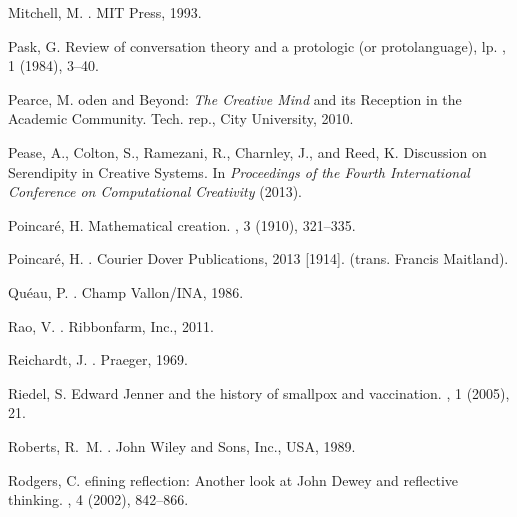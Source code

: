 \documentclass{llncs}
\begin{document}
\begin{thebibliography}{10}
{\sc Mitchell, M.}
.
\newblock MIT Press, 1993.

{\sc Pask, G.}
\newblock Review of conversation theory and a protologic (or protolanguage),
  lp.
, 1 (1984), 3--40.

{\sc Pearce, M.}
oden and {B}eyond: \emph{{T}he {C}reative {M}ind} and its
  {R}eception in the {A}cademic {C}ommunity.
\newblock Tech. rep., City University, 2010.

{\sc Pease, A., Colton, S., Ramezani, R., Charnley, J., and Reed, K.}
 {D}iscussion on {S}erendipity in {C}reative {S}ystems.
\newblock In {\em Proceedings of the Fourth International Conference on
  Computational Creativity\/} (2013).

{\sc Poincar{\'e}, H.}
\newblock Mathematical creation.
, 3 (1910), 321--335.

{\sc Poincar{\'e}, H.}
.
\newblock Courier Dover Publications, 2013 [1914].
\newblock (trans. Francis Maitland).

{\sc Qu{\'e}au, P.}
.
\newblock Champ Vallon/INA, 1986.

{\sc Rao, V.}
.
\newblock Ribbonfarm, Inc., 2011.

{\sc Reichardt, J.}
.
\newblock Praeger, 1969.

{\sc Riedel, S.}
\newblock Edward {J}enner and the history of smallpox and vaccination.
, 1 (2005),
  21.

{\sc Roberts, R.~M.}
.
\newblock John Wiley and Sons, Inc., USA, 1989.

{\sc Rodgers, C.}
efining reflection: {A}nother look at {J}ohn {D}ewey and
  reflective thinking.
, 4 (2002), 842--866.


\end{thebibliography}
\end{document}
